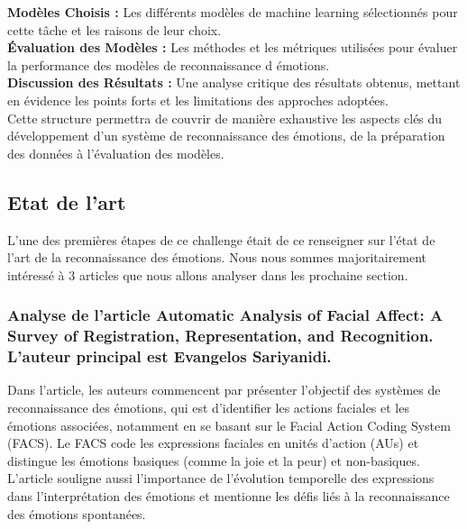 \documentclass{rapport}
\begin{document}
\textbf{Modèles Choisis :}
Les différents modèles de machine learning sélectionnés pour cette tâche et les raisons de leur choix.\\

\textbf{Évaluation des Modèles :}
Les méthodes et les métriques utilisées pour évaluer la performance des modèles de reconnaissance d émotions.\\

\textbf{Discussion des Résultats :}
Une analyse critique des résultats obtenus, mettant en évidence les points forts et les limitations des approches adoptées.\\

Cette structure permettra de couvrir de manière exhaustive les aspects clés du développement
d'un système de reconnaissance des émotions, de la préparation des données à l'évaluation des modèles.

\subsection{Etat de l'art}

L'une des premières étapes de ce challenge était de ce renseigner sur l'état
de l'art de la reconnaissance des émotions. Nous nous sommes majoritairement
intéressé à 3 articles que nous allons analyser dans les prochaine section.

\subsubsection{Analyse de l'article \cite{sariyanidiAutomaticAnalysisFacial2015} Automatic Analysis of Facial Affect: A Survey of Registration, Representation, and Recognition. L'auteur principal est Evangelos Sariyanidi.}

Dans l'article, les auteurs commencent par présenter l'objectif des systèmes de
reconnaissance des émotions, qui est d'identifier les actions faciales et les
émotions associées, notamment en se basant sur le Facial Action Coding System (FACS).
Le FACS code les expressions faciales en unités d'action (AUs) et distingue
les émotions basiques (comme la joie et la peur) et non-basiques. L'article
souligne aussi l'importance de l'évolution temporelle des expressions dans
l'interprétation des émotions et mentionne les défis liés à la reconnaissance des
émotions spontanées.\\
\end{document}
